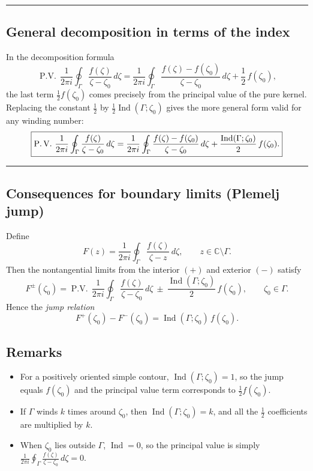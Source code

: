 \documentclass[11pt]{article}
\begin{document}
	\bigskip\hrule\bigskip
	
	\subsection*{General decomposition in terms of the index}
	
	In the decomposition formula
	\[
	\operatorname{P.V.}\,\frac{1}{2\pi i}\oint_{\Gamma}\frac{f(\zeta)}{\zeta-\zeta_{0}}\,d\zeta
	=
	\frac{1}{2\pi i}\oint_{\Gamma}\frac{f(\zeta)-f(\zeta_{0})}{\zeta-\zeta_{0}}\,d\zeta
	+\frac{1}{2}\,f(\zeta_{0}),
	\]
	the last term $\tfrac12 f(\zeta_{0})$ comes precisely from the principal value of the pure kernel.
	Replacing the constant $\tfrac12$ by $\tfrac12\operatorname{Ind}(\Gamma;\zeta_{0})$ gives the more general form valid for any winding number:
	\[
	\boxed{%
		\operatorname{P.V.}\,\frac{1}{2\pi i}\oint_{\Gamma}\frac{f(\zeta)}{\zeta-\zeta_{0}}\,d\zeta
		=
		\frac{1}{2\pi i}\oint_{\Gamma}\frac{f(\zeta)-f(\zeta_{0})}{\zeta-\zeta_{0}}\,d\zeta
		+\frac{\operatorname{Ind}(\Gamma;\zeta_{0})}{2}\,f(\zeta_{0}).
	}
	\]
	
	\bigskip\hrule\bigskip
	
	\subsection*{Consequences for boundary limits (Plemelj jump)}
	
	Define
	\[
	F(z)=\frac{1}{2\pi i}\oint_{\Gamma}\frac{f(\zeta)}{\zeta-z}\,d\zeta,
	\qquad z\in\mathbb{C}\setminus\Gamma.
	\]
	Then the nontangential limits from the interior $(+)$ and exterior $(-)$ satisfy
	\[
	F^{\pm}(\zeta_{0})
	=\operatorname{P.V.}\,\frac{1}{2\pi i}\oint_{\Gamma}\frac{f(\zeta)}{\zeta-\zeta_{0}}\,d\zeta
	\ \pm\ \frac{\operatorname{Ind}(\Gamma;\zeta_{0})}{2}\,f(\zeta_{0}),
	\qquad \zeta_{0}\in\Gamma.
	\]
	Hence the \emph{jump relation}
	\[
	\boxed{\,F^{+}(\zeta_{0})-F^{-}(\zeta_{0})
		=\operatorname{Ind}(\Gamma;\zeta_{0})\,f(\zeta_{0}).\,}
	\]
	
	\bigskip
	
	\subsection*{Remarks}
	
	\begin{itemize}
		\item For a positively oriented simple contour, $\operatorname{Ind}(\Gamma;\zeta_{0})=1$, so the jump equals $f(\zeta_{0})$ and the principal value term corresponds to $\tfrac{1}{2}f(\zeta_{0})$.
		\item If $\Gamma$ winds $k$ times around $\zeta_{0}$, then
		\(\operatorname{Ind}(\Gamma;\zeta_{0})=k\),
		and all the $\tfrac{1}{2}$ coefficients are multiplied by $k$.
		\item When $\zeta_{0}$ lies outside $\Gamma$, $\operatorname{Ind}=0$, so the principal value is simply
		\(\frac{1}{2\pi i}\oint_{\Gamma}\frac{f(\zeta)}{\zeta-\zeta_{0}}\,d\zeta=0.\)
	\end{itemize}
	
\end{document}

